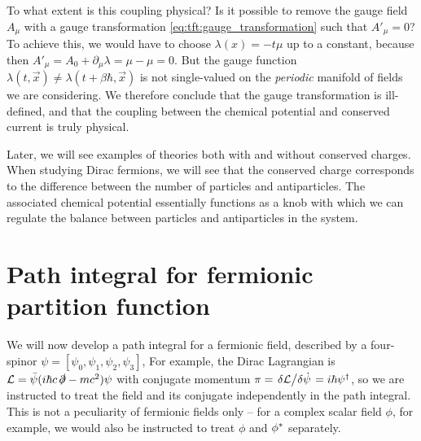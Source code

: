 To what extent is this coupling physical?
Is it possible to remove the gauge field $A_\mu$ with a gauge transformation \eqref{eq:tft:gauge_transformation} such that $A'_\mu = 0$?
To achieve this, we would have to choose $\lambda(x) = -t \mu$ up to a constant, because then $A'_\mu = A_0 + \partial_\mu \lambda = \mu - \mu = 0$.
But the gauge function $\lambda(t, \vec{x}) \neq \lambda(t + \beta \hbar, \vec{x})$ is not single-valued on the \emph{periodic} manifold of fields we are considering.
We therefore conclude that the gauge transformation is ill-defined, and that the coupling between the chemical potential and conserved current is truly physical.

Later, we will see examples of theories both with and without conserved charges.
When studying Dirac fermions, we will see that the conserved charge corresponds to the difference between the number of particles and antiparticles.
The associated chemical potential essentially functions as a knob with which we can regulate the balance between particles and antiparticles in the system.





\section{Path integral for fermionic partition function}

\newcommand\creat{\hat\psi^\dagger}
\newcommand\destr{\hat\psi        }

We will now develop a path integral for a fermionic field, described by a four-spinor $\psi = [ \psi_0, \psi_1, \psi_2, \psi_3 ]$,
For example, the Dirac Lagrangian is $\mathcal{L} = \bar{\psi} (i \hbar c \, \slashed\partial - m c^2) \psi$ with conjugate momentum $\pi = \fdv{\lagr}/{\dot\psi} = i \hbar \psi^\dagger$, so we are instructed to treat the field and its conjugate independently in the path integral.
This is not a peculiarity of fermionic fields only -- for a complex scalar field $\phi$, for example, we would also be instructed to treat $\phi$ and ${\phi}^*$ separately. 

